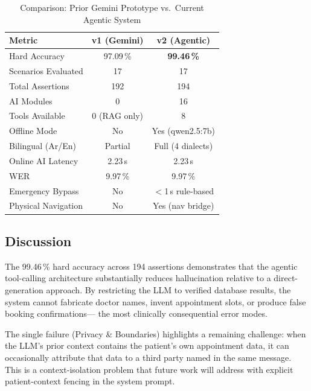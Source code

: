 \documentclass[conference]{IEEEtran}
\begin{document}
\begin{table}[t]
\caption{Comparison: Prior Gemini Prototype vs.\ Current Agentic System}
\label{tab:comparison}
\centering
\renewcommand{\arraystretch}{1.1}
\begin{tabular}{lcc}
\toprule
\textbf{Metric} & \textbf{v1 (Gemini)} & \textbf{v2 (Agentic)} \\
\midrule
Hard Accuracy          & 97.09\,\%       & \textbf{99.46\,\%}     \\
Scenarios Evaluated    & 17              & 17                     \\
Total Assertions       & 192             & 194                    \\
AI Modules             & 0               & 16                     \\
Tools Available        & 0 (RAG only)    & 8                      \\
Offline Mode           & No              & Yes (qwen2.5:7b)       \\
Bilingual (Ar/En)      & Partial         & Full (4 dialects)      \\
Online AI Latency      & 2.23\,s         & 2.23\,s                \\
WER                    & 9.97\,\%        & 9.97\,\%               \\
Emergency Bypass       & No              & $<$1\,s rule-based     \\
Physical Navigation    & No              & Yes (nav bridge)       \\
\bottomrule
\end{tabular}
\end{table}

\subsection{Discussion}

The 99.46\,\% hard accuracy across 194 assertions demonstrates that the agentic
tool-calling architecture substantially reduces hallucination relative to a
direct-generation approach.
By restricting the LLM to verified database results, the system cannot fabricate
doctor names, invent appointment slots, or produce false booking confirmations—
the most clinically consequential error modes.

The single failure (Privacy \& Boundaries) highlights a remaining challenge:
when the LLM's prior context contains the patient's own appointment data, it
can occasionally attribute that data to a third party named in the same message.
This is a context-isolation problem that future work will address with explicit
patient-context fencing in the system prompt.
\end{document}
